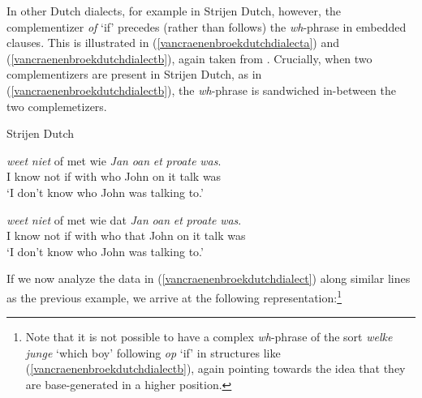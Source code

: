 
\noindent In other Dutch dialects, for example in Strijen Dutch, however, the complementizer \textit{of} `if' precedes (rather than follows) the \textit{wh}-phrase in embedded clauses. This is illustrated in (\ref{vancraenenbroekdutchdialecta}) and (\ref{vancraenenbroekdutchdialectb}), again taken from \citet[45--46]{van2012you}. Crucially, when two complementizers are present in Strijen Dutch, as in (\ref{vancraenenbroekdutchdialectb}), the \textit{wh}-phrase is sandwiched in-between the two complemetizers.
\clearpage

\begin{exe}
\ex Strijen Dutch \citep[45--46]{van2012you}\label{vancraenenbroekdutchdialect}\begin{xlist}
\ex {} {\textit{weet}} {\textit{niet}} {of} {met} {wie} {\textit{Jan}} {\textit{oan}} {\textit{et}} {\textit{proate}} {\textit{was}}.  \\
{I} {know} {not} {if} {with} {who} {John} {on} {it} {talk} {was} \\
\trans `I don't know who John was talking to.'  \label{vancraenenbroekdutchdialecta}

\ex {} {\textit{weet}} {\textit{niet}} {of} {met} {wie} {dat} {\textit{Jan}} {\textit{oan}} {\textit{et}} {\textit{proate}} {\textit{was}}.  \\
{I} {know} {not} {if} {with} {who} {that} {John} {on} {it} {talk} {was} \\
\trans `I don't know who John was talking to.'  \label{vancraenenbroekdutchdialectb}
\end{xlist}
\end{exe}

\noindent If we now analyze the data in (\ref{vancraenenbroekdutchdialect}) along similar lines as the previous example, we arrive at the following representation:\footnote{ Note that it is not possible to have a complex \textit{wh}-phrase of the sort \textit{welke junge} `which boy' following \textit{op} `if' in structures like (\ref{vancraenenbroekdutchdialectb}), again pointing towards the idea that they are base-generated in a higher position.}





